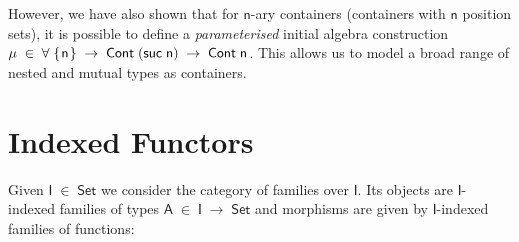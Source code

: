 \documentclass[a4paper]{article}
\makeatletter
\newcommand{\Conid}[1]{\mathit{#1}}
\newcommand{\Varid}[1]{\mathit{#1}}
\newcommand{\anonymous}{\kern0.06em \vbox{\hrule\@width.5em}}
\def\resethooks{%
  \global\let\SaveRestoreHook\empty
  \global\let\ColumnHook\empty}
\newlength{\blanklineskip}
\let\hspre\empty
\let\hspost\empty
\renewcommand\Varid[1]{\mathord{\textsf{#1}}}
\let\Conid\Varid
\makeatother
\begin{document}
However, we have also shown that for \ensuremath{\Varid{n}}-ary containers (containers with \ensuremath{\Varid{n}} position sets), it is possible to define a \emph{parameterised} initial algebra construction \ensuremath{\mu\;\in\;\forall{}\;\{\mskip1.5mu \Varid{n}\mskip1.5mu\}\;\rightarrow\;\Conid{Cont}\;(\Varid{suc}\;\Varid{n})\;\rightarrow\;\Conid{Cont}\;\Varid{n}}. This allows us to model a broad range of nested and mutual types as containers.




\section{Indexed Functors}
\label{sec:ifunc}


Given \ensuremath{\Conid{I}\;\in\;\Conid{Set}} we consider the category of families over \ensuremath{\Conid{I}}. Its objects are
\ensuremath{\Conid{I}}-indexed families of types \ensuremath{\Conid{A}\;\in\;\Conid{I}\;\rightarrow\;\Conid{Set}} and morphisms are given by 
\ensuremath{\Conid{I}}-indexed families of functions:


\resethooks
\end{document}
